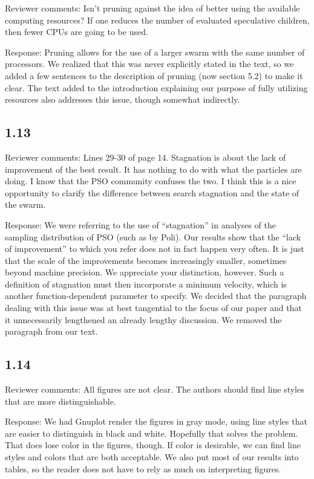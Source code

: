 \documentclass[onecolumn, 12pt]{article}
\begin{document}
Reviewer comments: Isn't pruning against the idea of better using the available
computing resources? If one reduces the number of evaluated speculative
children, then fewer CPUs are going to be used.

Response: Pruning allows for the use of a larger swarm with the same number of
processors.  We realized that this was never explicitly stated in the text, so
we added a few sentences to the description of pruning (now section 5.2) to
make it clear.  The text added to the introduction explaining our purpose of
fully utilizing resources also addresses this issue, though somewhat
indirectly.

\subsection*{1.13}

Reviewer comments: Lines 29-30 of page 14. Stagnation is about the lack of
improvement of the best result. It has nothing to do with what the particles
are doing. I know that the PSO community confuses the two. I think this is a
nice opportunity to clarify the difference between search stagnation and the
state of the swarm.

Response: We were referring to the use of ``stagnation'' in analyses of the
sampling distribution of PSO (such as by Poli).  Our results show that the
``lack of improvement'' to which you refer does not in fact happen very often.
It is just that the scale of the improvements becomes increasingly smaller,
sometimes beyond machine precision.  We appreciate your distinction, however.
Such a definition of stagnation must then incorporate a minimum velocity, which
is another function-dependent parameter to specify.  We decided that the
paragraph dealing with this issue was at best tangential to the focus of our
paper and that it unnecessarily lengthened an already lengthy discussion.  We
removed the paragraph from our text.

\subsection*{1.14}

Reviewer comments: All figures are not clear. The authors should find line
styles that are more distinguishable.

Response: We had Gnuplot render the figures in gray mode, using line styles
that are easier to distinguish in black and white.  Hopefully that solves the
problem.  That does lose color in the figures, though.  If color is desirable,
we can find line styles and colors that are both acceptable.  We also put most
of our results into tables, so the reader does not have to rely as much on
interpreting figures.
\end{document}
